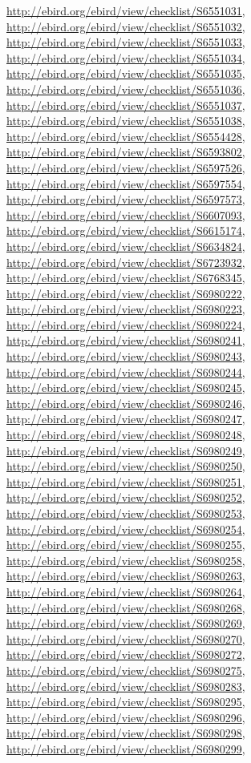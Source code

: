 \documentclass[9pt, article]{memoir}
\begin{document}
\begin{multicols}{2}
\url{http://ebird.org/ebird/view/checklist/S6551031}, 
\url{http://ebird.org/ebird/view/checklist/S6551032}, 
\url{http://ebird.org/ebird/view/checklist/S6551033}, 
\url{http://ebird.org/ebird/view/checklist/S6551034}, 
\url{http://ebird.org/ebird/view/checklist/S6551035}, 
\url{http://ebird.org/ebird/view/checklist/S6551036}, 
\url{http://ebird.org/ebird/view/checklist/S6551037}, 
\url{http://ebird.org/ebird/view/checklist/S6551038}, 
\url{http://ebird.org/ebird/view/checklist/S6554428}, 
\url{http://ebird.org/ebird/view/checklist/S6593802}, 
\url{http://ebird.org/ebird/view/checklist/S6597526}, 
\url{http://ebird.org/ebird/view/checklist/S6597554}, 
\url{http://ebird.org/ebird/view/checklist/S6597573}, 
\url{http://ebird.org/ebird/view/checklist/S6607093}, 
\url{http://ebird.org/ebird/view/checklist/S6615174}, 
\url{http://ebird.org/ebird/view/checklist/S6634824}, 
\url{http://ebird.org/ebird/view/checklist/S6723932}, 
\url{http://ebird.org/ebird/view/checklist/S6768345}, 
\url{http://ebird.org/ebird/view/checklist/S6980222}, 
\url{http://ebird.org/ebird/view/checklist/S6980223}, 
\url{http://ebird.org/ebird/view/checklist/S6980224}, 
\url{http://ebird.org/ebird/view/checklist/S6980241}, 
\url{http://ebird.org/ebird/view/checklist/S6980243}, 
\url{http://ebird.org/ebird/view/checklist/S6980244}, 
\url{http://ebird.org/ebird/view/checklist/S6980245}, 
\url{http://ebird.org/ebird/view/checklist/S6980246}, 
\url{http://ebird.org/ebird/view/checklist/S6980247}, 
\url{http://ebird.org/ebird/view/checklist/S6980248}, 
\url{http://ebird.org/ebird/view/checklist/S6980249}, 
\url{http://ebird.org/ebird/view/checklist/S6980250}, 
\url{http://ebird.org/ebird/view/checklist/S6980251}, 
\url{http://ebird.org/ebird/view/checklist/S6980252}, 
\url{http://ebird.org/ebird/view/checklist/S6980253}, 
\url{http://ebird.org/ebird/view/checklist/S6980254}, 
\url{http://ebird.org/ebird/view/checklist/S6980255}, 
\url{http://ebird.org/ebird/view/checklist/S6980258}, 
\url{http://ebird.org/ebird/view/checklist/S6980263}, 
\url{http://ebird.org/ebird/view/checklist/S6980264}, 
\url{http://ebird.org/ebird/view/checklist/S6980268}, 
\url{http://ebird.org/ebird/view/checklist/S6980269}, 
\url{http://ebird.org/ebird/view/checklist/S6980270}, 
\url{http://ebird.org/ebird/view/checklist/S6980272}, 
\url{http://ebird.org/ebird/view/checklist/S6980275}, 
\url{http://ebird.org/ebird/view/checklist/S6980283}, 
\url{http://ebird.org/ebird/view/checklist/S6980295}, 
\url{http://ebird.org/ebird/view/checklist/S6980296}, 
\url{http://ebird.org/ebird/view/checklist/S6980298}, 
\url{http://ebird.org/ebird/view/checklist/S6980299}, 

\end{multicols}
\end{document}
